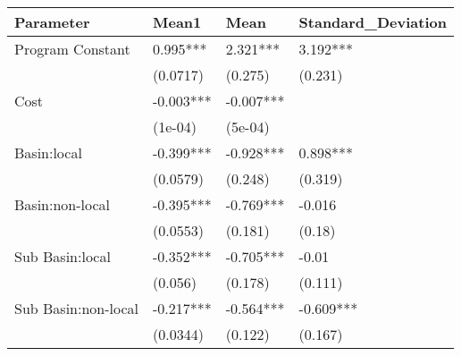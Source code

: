 \begin{table}[ht]
\centering
\begin{tabular}{llll}
  \hline
Parameter & Mean1 & Mean & Standard\_Deviation \\ 
  \hline
Program Constant & 0.995*** & 2.321*** & 3.192*** \\ 
   & (0.0717) & (0.275) & (0.231) \\ 
  Cost & -0.003*** & -0.007*** &  \\ 
   & (1e-04) & (5e-04) &  \\ 
  Basin:local & -0.399*** & -0.928*** & 0.898*** \\ 
   & (0.0579) & (0.248) & (0.319) \\ 
  Basin:non-local & -0.395*** & -0.769*** & -0.016 \\ 
   & (0.0553) & (0.181) & (0.18) \\ 
  Sub Basin:local & -0.352*** & -0.705*** & -0.01 \\ 
   & (0.056) & (0.178) & (0.111) \\ 
  Sub Basin:non-local  & -0.217*** & -0.564*** & -0.609*** \\ 
   & (0.0344) & (0.122) & (0.167) \\ 
   \hline
\end{tabular}
\end{table}
